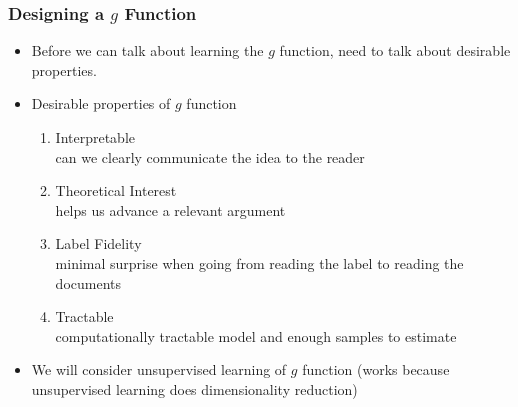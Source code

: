 \documentclass[xcolor=dvipsnames]{beamer}
\begin{document}
\begin{frame}
\frametitle{Designing a $g$ Function}

\begin{itemize}
\item Before we can talk about learning the $g$ function, need to talk about desirable properties. \pause
\item Desirable properties of $g$ function \pause
\begin{enumerate}
\item \alert{Interpretable} \\
can we clearly communicate the idea to the reader \pause
\item \alert{Theoretical Interest} \\
helps us advance a relevant argument \pause
\item \alert{Label Fidelity} \\
minimal surprise when going from reading the label to reading the documents \pause
\item \alert{Tractable} \\
computationally tractable model and enough samples to estimate \pause
\end{enumerate}
\item We will consider unsupervised learning of $g$ function (works because unsupervised learning does dimensionality reduction)
\end{itemize}
\end{frame}
\end{document}
